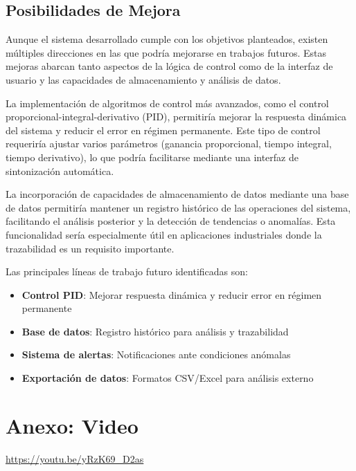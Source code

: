 \documentclass[12pt,a4paper]{article}
\begin{document}
\subsection{Posibilidades de Mejora}

Aunque el sistema desarrollado cumple con los objetivos planteados, existen múltiples direcciones en las que podría mejorarse en trabajos futuros. Estas mejoras abarcan tanto aspectos de la lógica de control como de la interfaz de usuario y las capacidades de almacenamiento y análisis de datos.

La implementación de algoritmos de control más avanzados, como el control proporcional-integral-derivativo (PID), permitiría mejorar la respuesta dinámica del sistema y reducir el error en régimen permanente. Este tipo de control requeriría ajustar varios parámetros (ganancia proporcional, tiempo integral, tiempo derivativo), lo que podría facilitarse mediante una interfaz de sintonización automática.

La incorporación de capacidades de almacenamiento de datos mediante una base de datos permitiría mantener un registro histórico de las operaciones del sistema, facilitando el análisis posterior y la detección de tendencias o anomalías. Esta funcionalidad sería especialmente útil en aplicaciones industriales donde la trazabilidad es un requisito importante.

Las principales líneas de trabajo futuro identificadas son:

\begin{itemize}
    \item \textbf{Control PID}: Mejorar respuesta dinámica y reducir error en régimen permanente
    \item \textbf{Base de datos}: Registro histórico para análisis y trazabilidad
    \item \textbf{Sistema de alertas}: Notificaciones ante condiciones anómalas
    \item \textbf{Exportación de datos}: Formatos CSV/Excel para análisis externo
\end{itemize}

\newpage
\appendix

\section{Anexo: Video}

\begin{center}
\url{https://youtu.be/yRzK69_D2as}
\end{center}
\end{document}
